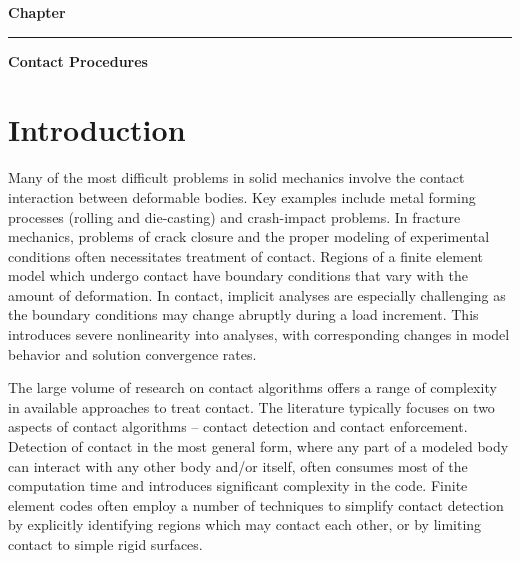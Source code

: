 \documentclass[11pt]{report}
\numberwithin{equation}{section}
\begin{document}
\LARGE
\hfill
\textbf{Chapter \thechapter}
\rule[0.15in]{450pt}{0.5mm}
\LARGE
\begin{flushright}
 \textbf{
{\selectfont Contact Procedures}}
\end{flushright}
\normalsize

%
\section{Introduction}


Many of the most difficult problems in solid mechanics involve the contact interaction 
between deformable bodies. Key examples include metal forming processes (rolling and 
die-casting) and crash-impact problems. In fracture mechanics, problems of crack closure 
and the proper modeling of experimental conditions often necessitates treatment of 
contact. Regions of a finite element model which undergo contact have boundary 
conditions that vary with the amount of deformation. In contact, implicit analyses 
are especially challenging as the boundary conditions may change abruptly during 
a load increment. This introduces severe nonlinearity into analyses, with 
corresponding changes in model behavior and solution convergence rates.

The large volume of research on contact algorithms offers a range of complexity 
in available approaches to treat contact. The literature typically focuses 
on two aspects of contact algorithms -- contact detection and contact enforcement. 
Detection of contact in the most general form, where any part of a modeled body 
can interact with any other body and/or itself, often consumes most of the computation 
time  and introduces significant complexity in the code. Finite element 
codes often employ a number of techniques to simplify contact detection by explicitly 
identifying regions which may contact each other, or by limiting contact to simple rigid 
surfaces. 
\end{document}
